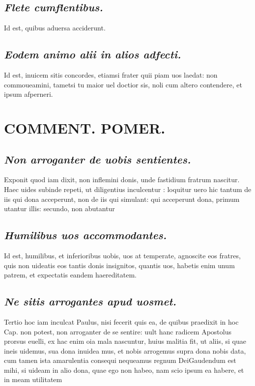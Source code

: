\documentclass{article}
\begin{document}
\begin{pages}
\subsection*{\textit{Flete cumflentibus. }}\pstart Id est, quibus aduersa acciderunt.   \pend
{}
{}
\subsection*{\textit{Eodem animo alii in alios adfecti. }}\pstart Id est, inuicem sitis concordes, etiamsi frater quii piam uos laedat: non commoueamini, tametsi tu maior uel doctior sis, noli cum altero contendere, et ipsum afperneri.   \pend
\section*{COMMENT. POMER.  }
{}
\subsection*{\textit{Non arroganter de uobis sentientes. }}\pstart Exponit quod iam dixit, non inflemini donis, unde fastidium fratrum nascitur. Haec uides subinde repeti, ut diligentius inculcentur : loquitur uero hic tantum de iis qui dona acceperunt, non de iis qui simulant: qui acceperunt dona, primum utantur illis: secundo, non abutantur  \pend
{}
{}
\subsection*{\textit{Humilibus uos accommodantes. }}\pstart Id est, humilibus, et inferioribus uobis, uos at temperate, agnoscite eos fratres, quis non uideatis eos tantis donis insignitos, quantis uos, habetis enim unum patrem, et expectatis eandem haereditatem.   \pend
{}
{}
\subsection*{\textit{Ne sitis arrogantes apud uosmet. }}\pstart Tertio hoc iam inculcat Paulus, nisi fecerit quis ea, de quibus praedixit in hoc Cap. non potest, non arroganter de se sentire: uult hanc radicem Apostolus prorsus euelli, ex hac enim oia mala nascuntur, huius malitia fit, ut aliis, si quae ineis uidemus, sua dona inuidea mus, et nobis arrogemus supra dona nobis data, cum tamen ista amarulentia consequi nequeamus regnum DeiGaudendum est mihi, si uideam in alio dona, quae ego non habeo, nam scio ipsum ea habere, et in meam utilitatem  \pend
{}
{}

\end{pages}
\end{document}
